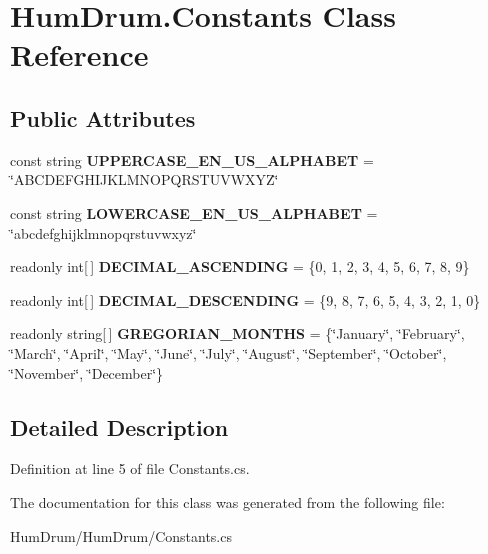 \hypertarget{classHumDrum_1_1Constants}{}\section{Hum\+Drum.\+Constants Class Reference}
\label{classHumDrum_1_1Constants}
\subsection*{Public Attributes}
\begin{DoxyCompactItemize}
\item 
const string {\bfseries U\+P\+P\+E\+R\+C\+A\+S\+E\+\_\+\+E\+N\+\_\+\+U\+S\+\_\+\+A\+L\+P\+H\+A\+B\+ET} = \char`\"{}A\+B\+C\+D\+E\+F\+G\+H\+I\+J\+K\+L\+M\+N\+O\+P\+Q\+R\+S\+T\+U\+V\+W\+X\+YZ\char`\"{}\hypertarget{classHumDrum_1_1Constants_a5c84cabf6f11daf42d972cbba5727d92}{}\label{classHumDrum_1_1Constants_a5c84cabf6f11daf42d972cbba5727d92}

\item 
const string {\bfseries L\+O\+W\+E\+R\+C\+A\+S\+E\+\_\+\+E\+N\+\_\+\+U\+S\+\_\+\+A\+L\+P\+H\+A\+B\+ET} = \char`\"{}abcdefghijklmnopqrstuvwxyz\char`\"{}\hypertarget{classHumDrum_1_1Constants_a3d375baba6dd42c605dcccbe9b81295d}{}\label{classHumDrum_1_1Constants_a3d375baba6dd42c605dcccbe9b81295d}

\item 
readonly int\mbox{[}$\,$\mbox{]} {\bfseries D\+E\+C\+I\+M\+A\+L\+\_\+\+A\+S\+C\+E\+N\+D\+I\+NG} = \{0, 1, 2, 3, 4, 5, 6, 7, 8, 9\}\hypertarget{classHumDrum_1_1Constants_a814534849abf7d606c65e98ac02c016d}{}\label{classHumDrum_1_1Constants_a814534849abf7d606c65e98ac02c016d}

\item 
readonly int\mbox{[}$\,$\mbox{]} {\bfseries D\+E\+C\+I\+M\+A\+L\+\_\+\+D\+E\+S\+C\+E\+N\+D\+I\+NG} = \{9, 8, 7, 6, 5, 4, 3, 2, 1, 0\}\hypertarget{classHumDrum_1_1Constants_a29f50448b47e5329589255efe218f69d}{}\label{classHumDrum_1_1Constants_a29f50448b47e5329589255efe218f69d}

\item 
readonly string\mbox{[}$\,$\mbox{]} {\bfseries G\+R\+E\+G\+O\+R\+I\+A\+N\+\_\+\+M\+O\+N\+T\+HS} = \{\char`\"{}January\char`\"{}, \char`\"{}February\char`\"{}, \char`\"{}March\char`\"{}, \char`\"{}April\char`\"{}, \char`\"{}May\char`\"{}, \char`\"{}June\char`\"{}, \char`\"{}July\char`\"{}, \char`\"{}August\char`\"{}, \char`\"{}September\char`\"{}, \char`\"{}October\char`\"{}, \char`\"{}November\char`\"{}, \char`\"{}December\char`\"{}\}\hypertarget{classHumDrum_1_1Constants_a904c1a67a15b806e5262fd0301b2040e}{}\label{classHumDrum_1_1Constants_a904c1a67a15b806e5262fd0301b2040e}

\end{DoxyCompactItemize}


\subsection{Detailed Description}


Definition at line 5 of file Constants.\+cs.



The documentation for this class was generated from the following file\+:\begin{DoxyCompactItemize}
\item 
Hum\+Drum/\+Hum\+Drum/Constants.\+cs\end{DoxyCompactItemize}
